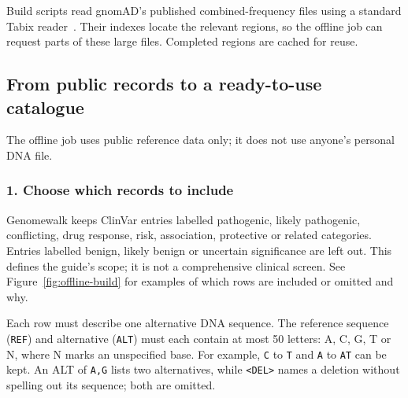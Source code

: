 \documentclass[10pt,twocolumn,letterpaper]{article}
\newcommand{\code}[1]{\texttt{\small #1}}
\begin{document}
Build scripts read gnomAD's published combined-frequency files using a standard Tabix reader~\cite{tabixjs}. Their indexes locate the relevant regions, so the offline job can request parts of these large files. Completed regions are cached for reuse.

\subsection{From public records to a ready-to-use catalogue}
The offline job uses public reference data only; it does not use anyone's personal DNA file.

\subsubsection*{1. Choose which records to include}
Genomewalk keeps ClinVar entries labelled pathogenic, likely pathogenic, conflicting, drug response, risk, association, protective or related categories. Entries labelled benign, likely benign or uncertain significance are left out. This defines the guide's scope; it is not a comprehensive clinical screen. See Figure~\ref{fig:offline-build} for examples of which rows are included or omitted and why.

Each row must describe one alternative DNA sequence. The reference sequence (\code{REF}) and alternative (\code{ALT}) must each contain at most 50 letters: A, C, G, T or N, where N marks an unspecified base. For example, \code{C} to \code{T} and \code{A} to \code{AT} can be kept. An ALT of \code{A,G} lists two alternatives, while \code{<DEL>} names a deletion without spelling out its sequence; both are omitted.
\end{document}
